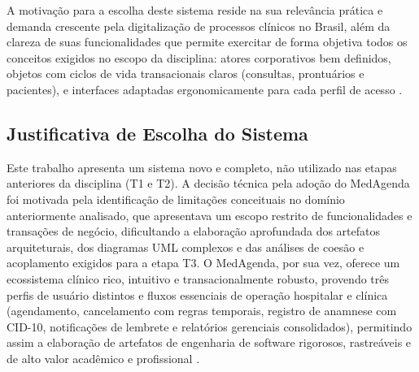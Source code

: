 A motivação para a escolha deste sistema reside na sua relevância prática e demanda crescente pela digitalização de processos clínicos no Brasil, além da clareza de suas funcionalidades que permite exercitar de forma objetiva todos os conceitos exigidos no escopo da disciplina: atores corporativos bem definidos, objetos com ciclos de vida transacionais claros (consultas, prontuários e pacientes), e interfaces adaptadas ergonomicamente para cada perfil de acesso \cite{shneiderman2016}.

\subsection{Justificativa de Escolha do Sistema}

Este trabalho apresenta um sistema novo e completo, não utilizado nas etapas anteriores da disciplina (T1 e T2). A decisão técnica pela adoção do MedAgenda foi motivada pela identificação de limitações conceituais no domínio anteriormente analisado, que apresentava um escopo restrito de funcionalidades e transações de negócio, dificultando a elaboração aprofundada dos artefatos arquiteturais, dos diagramas UML complexos e das análises de coesão e acoplamento exigidos para a etapa T3. O MedAgenda, por sua vez, oferece um ecossistema clínico rico, intuitivo e transacionalmente robusto, provendo três perfis de usuário distintos e fluxos essenciais de operação hospitalar e clínica (agendamento, cancelamento com regras temporais, registro de anamnese com CID-10, notificações de lembrete e relatórios gerenciais consolidados), permitindo assim a elaboração de artefatos de engenharia de software rigorosos, rastreáveis e de alto valor acadêmico e profissional \cite{bassi2015, silberschatz2020}.
